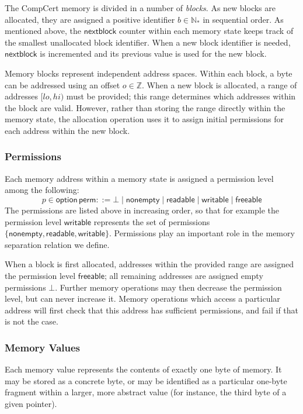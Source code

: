 \documentclass[acmsmall,screen,review,anonymous]{acmart}
\newcommand{\kw}[1]{\ensuremath{ \mathsf{#1} }}
\begin{document}
The CompCert memory is divided in a number of \emph{blocks}.
As new blocks are allocated,
they are assigned a positive identifier $b \in \mathbb{N}_*$
in sequential order.
As mentioned above,
the $\kw{nextblock}$ counter within each memory state
keeps track of the smallest unallocated block identifier.
When a new block identifier is needed,
$\kw{nextblock}$ is incremented and its previous value
is used for the new block.

Memory blocks represent independent address spaces.
Within each block,
a byte can be addressed using an offset $o \in \mathbb{Z}$.
When a new block is allocated,
a range of addresses $[\mathit{lo}, \mathit{hi})$ must be provided;
this range determines which addresses within the block are valid.
However,
rather than storing the range directly within the memory state,
the allocation operation uses it to assign initial permissions
for each address within the new block.

\subsubsection{Permissions}

Each memory address within a memory state
is assigned a permission level among the following:
\[
  p \in \kw{option}\,\kw{perm} ::=
    \bot \mid
    \kw{nonempty} \mid
    \kw{readable} \mid
    \kw{writable} \mid
    \kw{freeable}
\]
The permissions are listed above in increasing order,
so that for example the permission level $\kw{writable}$ 
represents the set of permissions
$\{ \kw{nonempty}, \kw{readable}, \kw{writable} \}$.
Permissions play an important role
in the memory separation relation we define.

When a block is first allocated,
addresses within the provided range
are assigned the permission level $\kw{freeable}$;
all remaining addresses are assigned
empty permissions $\bot$.
Further memory operations may then decrease the permission level,
but can never increase it.
Memory operations which access a particular address
will first check that this address has sufficient permissions,
and fail if that is not the case.

\subsubsection{Memory Values}

Each memory value represents the contents of exactly one byte of memory.
It may be stored as a concrete byte,
or may be identified as a particular one-byte fragment
within a larger, more abstract value
(for instance, the third byte of a given pointer).
\end{document}
